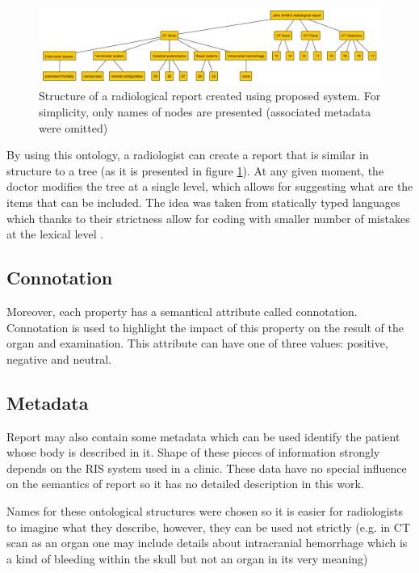 \documentclass[12pt, twoside, openany]{report}
\theoremstyle{definition}
\begin{document}
\begin{figure}
    \centering
    \includegraphics[width=\linewidth]{report-tree.pdf}
    \caption{Structure of a radiological report created \label{fig:report-tree} using proposed system. For simplicity, only names of nodes are presented (associated metadata were omitted)}
\end{figure}

By using this ontology, a radiologist can create a report that is similar in structure to a tree (as it is presented in figure \ref{fig:report-tree}). At any given moment, the doctor modifies the tree at a single level, which allows for suggesting what are the items that can be included. The idea was taken from statically typed languages which thanks to their strictness allow for coding with smaller number of mistakes at the lexical level \cite{static-lang}.






\subsection{Connotation}
Moreover, each property has a semantical attribute called connotation. Connotation is used to highlight the impact of this property on the result of the organ and examination. This attribute can have one of three values: positive, negative and neutral. 
\subsection{Metadata}
Report may also contain some metadata which can be used identify the patient whose body is described in it. Shape of these pieces of information strongly depends on the RIS system used in a clinic. These data have no special influence on the semantics of report so it has no detailed description in this work.

Names for these ontological structures were chosen so it is easier for radiologists to imagine what they describe, however, they can be used not strictly (e.g. in CT scan as an organ one may include details about intracranial hemorrhage which is a kind of bleeding within the skull \cite{ich} but not an organ in its very meaning)
\end{document}
